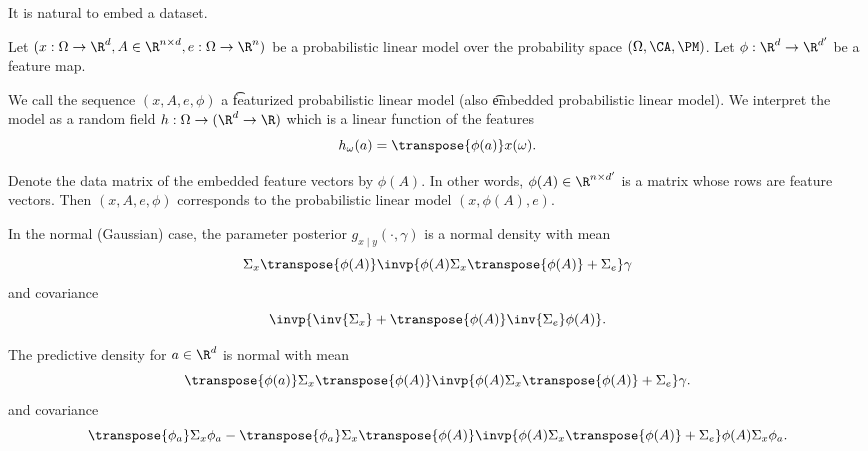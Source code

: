 

It is natural to embed a dataset.


Let $(x: \Omega \to \R^d, A \in \R^{n \times d}, e: \Omega \to \R^n)$ be a probabilistic linear model over the probability space $(\Omega, \CA, \PM)$.
Let $\phi: \R^d \to \R^{d'}$ be a feature map.

We call the sequence $(x, A, e, \phi)$ a \t{featurized probabilistic linear model} (also \t{embedded probabilistic linear model}).
We interpret the model as a random field $h: \Omega \to (\R^d \to \R)$ which is a linear function of the features
\[
  h_{\omega}(a) = \transpose{\phi(a)}x(\omega).
\]

Denote the data matrix of the embedded feature vectors by $\phi(A)$.
In other words, $\phi(A) \in \R^{n \times d'}$ is a matrix whose rows are feature vectors.
Then $(x, A, e, \phi)$ corresponds to the probabilistic linear model $(x, \phi(A), e)$.


In the normal (Gaussian) case, the parameter posterior $g_{x \mid y}(\cdot, \gamma)$ is a normal density with mean
\[
  \Sigma_{x}\transpose{\phi(A)}\invp{\phi(A)\Sigma_{x}\transpose{\phi(A)} + \Sigma_{e}} \gamma
\]
and covariance
\[
  \invp{\inv{\Sigma_{x}} + \transpose{\phi(A)}\inv{\Sigma_{e}}\phi(A)}.
\]

The predictive density for $a \in \R^d$ is normal with mean
\[
  \transpose{\phi(a)}\Sigma_{x}\transpose{\phi(A)}\invp{\phi(A)\Sigma_{x}\transpose{\phi(A)} + \Sigma_{e}}\gamma.
\]
and covariance
\[
  \transpose{\phi_a}\Sigma_{x}\phi_a - \transpose{\phi_a}\Sigma_{x}\transpose{\phi(A)}\invp{\phi(A)\Sigma_{x}\transpose{\phi(A)} + \Sigma_e}\phi(A)\Sigma_{x}\phi_a.
\]

